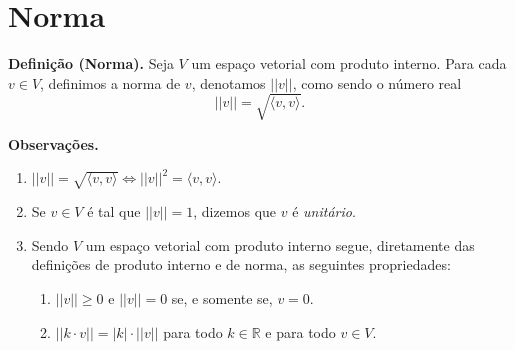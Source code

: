 \section{Norma}

\textbf{Definição (Norma).} Seja $V$ um espaço vetorial com produto interno.  Para cada $v \in V$, definimos a norma de $v$, denotamos $||v||$, como sendo o número real
$$||v||= \sqrt{\langle v, v \rangle }. $$

\vspace{0.7cm}
\noindent \textbf{Observações.}

\begin{enumerate}
\item $||v||= \sqrt{\langle v, v \rangle}  \Longleftrightarrow ||v||^2=  \langle v, v \rangle$.
\item Se $v \in V$ é tal que $||v||=1$, dizemos que $v$ é \textit{unitário}.

\item Sendo $V$ um espaço vetorial com produto interno segue, diretamente das definições de produto interno e de norma, as seguintes propriedades:

\begin{enumerate}[label=(\roman*)]%
\item  $|| v ||  \geq 0$  e  $|| v || = 0$  se, e somente se, $v=0$.
\item  $||k \cdot v ||  = |k|\cdot|| v ||  $   para todo $k \in \mathbb{R}$ e para todo  $v \in V$.
\end{enumerate}

\end{enumerate}


